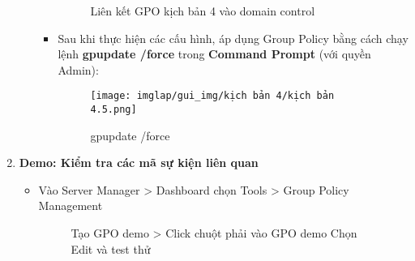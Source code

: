 \documentclass[13pt]{article}
\begin{document}
\begin{enumerate}
\begin{itemize}
\begin{itemize}
\begin{figure}[H]
    \caption{Liên kết GPO kịch bản 4 vào domain control}
    \label{fig:enter-label}
\end{figure}
\item Sau khi thực hiện các cấu hình, áp dụng Group Policy bằng cách chạy lệnh \textbf{gpupdate /force} trong \textbf{Command Prompt} (với quyền Admin): 
\begin{figure}[H]
                                    \centering
                                    \texttt{[image: imglap/gui\_img/kịch bản 4/kịch bản 4.5.png]}
                                    \caption{gpupdate /force}
                                    \label{fig:enter-label}
                                \end{figure}
                                                                \end{itemize}
            \end{itemize}
            \item \textbf{Demo: Kiểm tra các mã sự kiện liên quan}
            \begin{itemize}
                    
                    \begin{itemize}
                    \item Vào Server Manager > Dashboard chọn Tools > Group Policy Management \begin{figure}[H]
 		\hfill
 		\hfill
 				\caption{Tạo GPO demo > Click chuột phải vào GPO demo Chọn Edit và test thử}
 				\label{fig:AD_p2}
 		\end{figure}


\end{itemize}
\end{itemize}
\end{enumerate}
\end{document}
